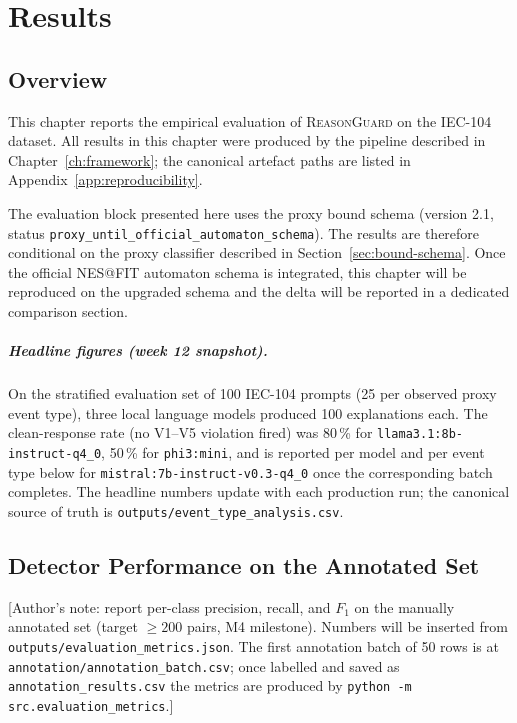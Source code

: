 \chapter{Results}
\label{ch:results}

\section{Overview}
\label{sec:results-overview}

This chapter reports the empirical evaluation of \textsc{ReasonGuard} on the
IEC-104 dataset. All results in this chapter were produced by the pipeline
described in Chapter~\ref{ch:framework}; the canonical artefact paths are
listed in Appendix~\ref{app:reproducibility}.

The evaluation block presented here uses the proxy bound schema
(version 2.1, status \texttt{proxy\_until\_official\_automaton\_schema}). The
results are therefore conditional on the proxy classifier described in
Section~\ref{sec:bound-schema}. Once the official NES@FIT automaton schema is
integrated, this chapter will be reproduced on the upgraded schema and the
delta will be reported in a dedicated comparison section.

\paragraph{Headline figures (week 12 snapshot).}
On the stratified evaluation set of 100 IEC-104 prompts (25 per observed proxy
event type), three local language models produced 100 explanations each. The
clean-response rate (no V1--V5 violation fired) was 80\,\% for
\texttt{llama3.1:8b-instruct-q4_0}, 50\,\% for \texttt{phi3:mini}, and is
reported per model and per event type below for \texttt{mistral:7b-instruct-v0.3-q4_0}
once the corresponding batch completes. The headline numbers update with each
production run; the canonical source of truth is
\texttt{outputs/event\_type\_analysis.csv}.

\section{Detector Performance on the Annotated Set}
\label{sec:results-detector}

[Author's note: report per-class precision, recall, and $F_1$ on the manually
annotated set (target $\geq200$ pairs, M4 milestone). Numbers will be inserted
from \texttt{outputs/evaluation\_metrics.json}. The first annotation batch of
50 rows is at \texttt{annotation/annotation\_batch.csv}; once labelled and
saved as \texttt{annotation\_results.csv} the metrics are produced by
\texttt{python -m src.evaluation\_metrics}.]

